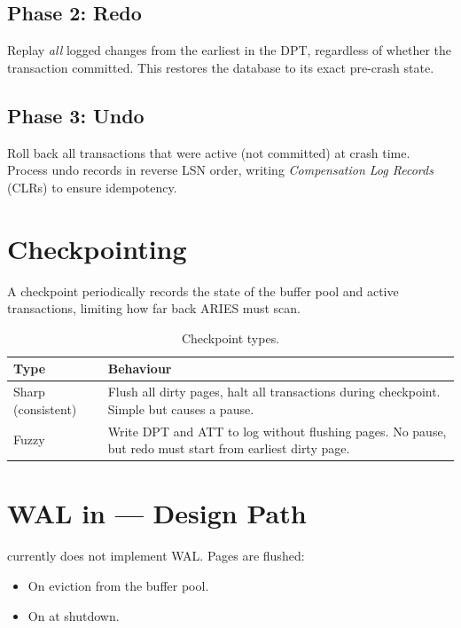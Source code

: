 \subsection{Phase 2: Redo}

Replay \emph{all} logged changes from the earliest  in the DPT, regardless of whether the transaction committed.  This restores the database to its exact pre-crash state.

\subsection{Phase 3: Undo}

Roll back all transactions that were active (not committed) at crash time.  Process undo records in reverse LSN order, writing \emph{Compensation Log Records} (CLRs) to ensure idempotency.

\section{Checkpointing}
\label{sec:checkpoint}

A checkpoint periodically records the state of the buffer pool and active transactions, limiting how far back ARIES must scan.

\begin{table}[H]
\centering
\caption{Checkpoint types.}
\begin{tabular}{l p{12cm}}
\toprule
\textbf{Type} & \textbf{Behaviour} \\
\midrule
Sharp (consistent) & Flush all dirty pages, halt all transactions during checkpoint.  Simple but causes a pause. \\
Fuzzy              & Write DPT and ATT to log without flushing pages.  No pause, but redo must start from earliest dirty page. \\
\bottomrule
\end{tabular}
\end{table}

\section{WAL in \shiftdb{} --- Design Path}

\shiftdb{} currently does not implement WAL.  Pages are flushed:
\begin{itemize}[nosep]
  \item On eviction from the buffer pool.
  \item On  at shutdown.
\end{itemize}

